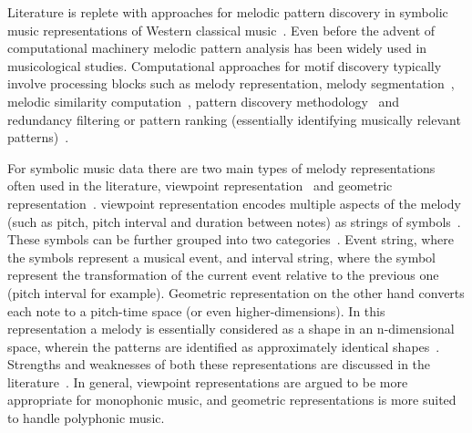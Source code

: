 Literature is replete with approaches for melodic pattern discovery in symbolic music representations of Western classical music~\citep{cambouropoulos1997towards,meredith2006point,conklin2001representation,Lartillot2005b}. Even before the advent of computational machinery melodic pattern analysis has been widely used in musicological studies. Computational approaches for motif discovery typically involve processing blocks such as melody representation\citep{meredith2006point}, melody segmentation~\citep{Cambouropoulos2006}, melodic similarity computation~\citep{Cambouropoulos2001,Marsden2012}, pattern discovery methodology~\citep{collins2013siarct,meredith2002algorithms} and redundancy filtering or pattern ranking (essentially identifying musically relevant patterns)~\citep{Lartillot2005,conklin2010discovery}. 

For symbolic music data there are two main types of melody representations often used in the literature, viewpoint representation~\citep{conklin1995multiple} and geometric representation~\citep{meredith2002algorithms}. viewpoint representation encodes multiple aspects of the melody (such as pitch, pitch interval and duration between notes) as strings of symbols~\citep{conklin2001representation}. These symbols can be further grouped into two categories~\citep{meredith2002algorithms}. Event string, where the symbols represent a musical event, and interval string, where the symbol represent the transformation of the current event relative to the previous one (pitch interval for example). Geometric representation on the other hand converts each note to a pitch-time space (or even higher-dimensions). In this representation a melody is essentially considered as a shape in an n-dimensional space, wherein the patterns are identified as approximately identical shapes~\citep{meredith2002algorithms}. Strengths and weaknesses of both these representations are discussed in the literature~\cite{Cambouropoulos2009,meredith2002algorithms}. In general, viewpoint representations are argued to be more appropriate for monophonic music, and geometric representations is more suited to handle polyphonic music. 


